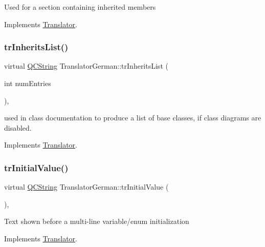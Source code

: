 Used for a section containing inherited members 

Implements \mbox{\hyperlink{class_translator}{Translator}}.

\mbox{\label{class_translator_german_a138af91a896e595619a747a8b028e575}} 
\subsubsection{\texorpdfstring{trInheritsList()}{trInheritsList()}}
{\footnotesize\ttfamily virtual \mbox{\hyperlink{class_q_c_string}{Q\+C\+String}} Translator\+German\+::tr\+Inherits\+List (\begin{DoxyParamCaption}\item[{int}]{num\+Entries }\end{DoxyParamCaption})\hspace{0.3cm}{\ttfamily [inline]}, {\ttfamily [virtual]}}

used in class documentation to produce a list of base classes, if class diagrams are disabled. 

Implements \mbox{\hyperlink{class_translator}{Translator}}.

\mbox{\label{class_translator_german_abc101853223d2d0aae618122cb9db82c}} 
\subsubsection{\texorpdfstring{trInitialValue()}{trInitialValue()}}
{\footnotesize\ttfamily virtual \mbox{\hyperlink{class_q_c_string}{Q\+C\+String}} Translator\+German\+::tr\+Initial\+Value (\begin{DoxyParamCaption}{ }\end{DoxyParamCaption})\hspace{0.3cm}{\ttfamily [inline]}, {\ttfamily [virtual]}}

Text shown before a multi-\/line variable/enum initialization 

Implements \mbox{\hyperlink{class_translator}{Translator}}.

\mbox{\label{class_translator_german_a2eb5ae984194c1abae2b5c81aa8f2f7e}} 
